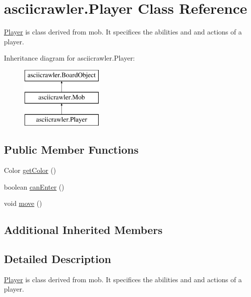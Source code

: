 \hypertarget{classasciicrawler_1_1Player}{}\section{asciicrawler.\+Player Class Reference}
\label{classasciicrawler_1_1Player}


\hyperlink{classasciicrawler_1_1Player}{Player} is class derived from mob. It specifices the abilities and and actions of a player.  


Inheritance diagram for asciicrawler.\+Player\+:\begin{figure}[H]
\begin{center}
\leavevmode
\includegraphics[height=3.000000cm]{classasciicrawler_1_1Player}
\end{center}
\end{figure}
\subsection*{Public Member Functions}
\begin{DoxyCompactItemize}
\item 
Color \hyperlink{classasciicrawler_1_1Player_a5c51590842281f692f09826886933be7}{get\+Color} ()
\item 
boolean \hyperlink{classasciicrawler_1_1Player_a45d5a582e0d18c69ac72b19218b00a97}{can\+Enter} ()
\item 
void \hyperlink{classasciicrawler_1_1Player_af176593345048bd28121f41f7e6d1723}{move} ()
\end{DoxyCompactItemize}
\subsection*{Additional Inherited Members}


\subsection{Detailed Description}
\hyperlink{classasciicrawler_1_1Player}{Player} is class derived from mob. It specifices the abilities and and actions of a player. 

